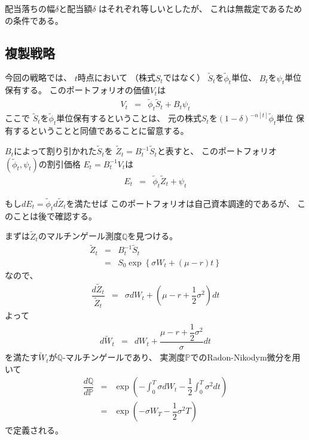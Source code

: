 \documentclass[uplatex,a4j,12pt,dvipdfmx]{jsarticle}
\begin{document}
配当落ちの幅$\delta$と配当額$\delta$
はそれぞれ等しいとしたが、
これは無裁定であるための条件である。
\subsection{複製戦略}

今回の戦略では、
$t$時点において
（株式$S_{t}$ではなく）
$\tilde{S}_{t}$を$\tilde{\phi}_{t}$単位、
$B_{t}$を$\psi_{t}$単位保有する。
このポートフォリオの価値$V_{t}$は
%
%
\begin{eqnarray*}
	V_{t}
	&=&
	\tilde{\phi}_{t} \tilde{S}_{t} + B_{t} \psi_{t}
\end{eqnarray*}
%
%
ここで
$\tilde{S}_{t}$を$\tilde{\phi}_{t}$単位保有するということは、
元の株式$S_{t}$を$(1-\delta)^{-n[t]} \tilde{\phi}_{t}$単位
保有するということと同値であることに留意する。

$B_{t}$によって割り引かれた$\tilde{S}_{t}$を
$\tilde{Z}_{t} = B^{-1}_{t} \tilde{S}_{t}$と表すと、
このポートフォリオ$(\tilde{\phi}_{t},\psi_{t})$の割引価格
$E_{t}=B^{-1}_{t} V_{t}$は
%
%
\begin{eqnarray*}
	E_{t}
	&=&
	\tilde{\phi}_{t} \tilde{Z}_{t} + \psi_{t}
\end{eqnarray*}
%
%

もし$dE_{t} = \tilde{\phi}_{t} d \tilde{Z}_{t}$を満たせば
このポートフォリオは自己資本調達的であるが、
このことは後で確認する。

まずは$\tilde{Z}_{t}$のマルチンゲール測度$\mathbb{Q}$を見つける。
%
%
\begin{eqnarray*}
	\tilde{Z}_{t}
	&=&
	B^{-1}_{t} \tilde{S}_{t}
	\\ &=&
	S_{0} \exp \left\{ \sigma W_{t} + ( \mu - r ) t \right\}
\end{eqnarray*}
%
%
なので、
%
%
\begin{eqnarray*}
	\dfrac{d \tilde{Z}_{t}}{\tilde{Z}_{t}}
	&=&
	\sigma dW_{t} + \left( \mu - r + \dfrac{1}{2} \sigma^{2} \right) dt
\end{eqnarray*}
%
%
よって
%
%
\begin{eqnarray*}
	d \tilde{W}_{t}
	&=&
	dW_{t}
	+
	\dfrac{\mu - r + \dfrac{1}{2} \sigma^{2} }{\sigma} dt
\end{eqnarray*}
%
%
を満たす$\tilde{W}_{t}$が$\mathbb{Q}$-マルチンゲールであり、
実測度$\mathbb{P}$でのRadon-Nikodym微分を用いて
%
%
\begin{eqnarray*}
	\dfrac{d \mathbb{Q} }{ d \mathbb{P} }
	&=&
	\exp \left(
	-
	\int^{T}_{0} \sigma dW_{t}
	-
	\dfrac{1}{2}
	\int^{T}_{0} \sigma^{2} dt
	\right)
	\\ &=&
	\exp \left(
	-
	\sigma W_{T}
	-
	\dfrac{1}{2}
	\sigma^{2} T
	\right)
\end{eqnarray*}
%
%
で定義される。
\end{document}
